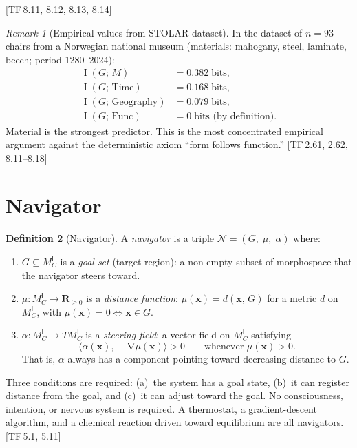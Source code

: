 \documentclass[11pt, a4paper]{article}
\theoremstyle{definition}
\newtheorem{definition}{Definition}[section]
\theoremstyle{plain}
\theoremstyle{remark}
\newtheorem{remark}[definition]{Remark}
\newcommand{\MC}{M^{\mathsf{I}}_C}          %
\providecommand{\R}{}
\renewcommand{\R}{\mathbf{R}}               %
\newcommand{\Nav}{\mathcal{N}}               %
\newcommand{\inner}[2]{\langle #1, #2 \rangle}
\DeclareMathOperator{\grad}{\nabla}
\DeclareMathOperator{\MI}{I}                 %
\newcommand{\TF}[1]{\textnormal{[TF\,#1]}}  %
\begin{document}
\TF{8.11, 8.12, 8.13, 8.14}

\begin{remark}[Empirical values from STOLAR dataset]
In the dataset of $n = 93$ chairs from a Norwegian national museum
(materials: mahogany, steel, laminate, beech; period 1280--2024):
\begin{align*}
  \MI(G;\, M) &= 0.382 \;\text{bits}, \\
  \MI(G;\, \mathrm{Time}) &= 0.168 \;\text{bits}, \\
  \MI(G;\, \mathrm{Geography}) &= 0.079 \;\text{bits}, \\
  \MI(G;\, \mathrm{Func}) &= 0 \;\text{bits (by definition).}
\end{align*}
Material is the strongest predictor. This is the most concentrated
empirical argument against the deterministic axiom ``form follows
function.'' \TF{2.61, 2.62, 8.11--8.18}
\end{remark}

\newpage
\section{Navigator}\label{sec:navigator}

\begin{definition}[Navigator]\label{def:6.1}
A \emph{navigator} is a triple
$\Nav = (G,\; \mu,\; \alpha)$
where:
\begin{enumerate}[label=(\alph*),nosep]
  \item $G \subseteq \MC$ is a \emph{goal set} (target region): a
    non-empty subset of morphospace that the navigator steers toward.
  \item $\mu : \MC \to \R_{\geq 0}$ is a \emph{distance function}:
    $\mu(\bm{x}) = d(\bm{x},\, G)$ for a metric $d$ on $\MC$, with
    $\mu(\bm{x}) = 0 \iff \bm{x} \in G$.
  \item $\alpha : \MC \to T\MC$ is a \emph{steering field}: a vector
    field on $\MC$ satisfying
    \[
      \inner{\alpha(\bm{x})}{\!-\grad\mu(\bm{x})} > 0
      \qquad \text{whenever } \mu(\bm{x}) > 0.
    \]
    That is, $\alpha$ always has a component pointing toward decreasing
    distance to $G$.
\end{enumerate}

\medskip\noindent
Three conditions are required: (a)~the system has a goal state,
(b)~it can register distance from the goal, and (c)~it can adjust
toward the goal. No consciousness, intention, or nervous system is
required. A thermostat, a gradient-descent algorithm, and a chemical
reaction driven toward equilibrium are all navigators. \TF{5.1, 5.11}
\end{definition}
\end{document}
